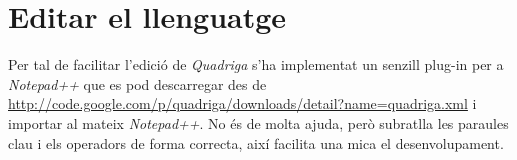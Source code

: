 \section{Editar el llenguatge}

Per tal de facilitar l'edició de {\em Quadriga} s'ha implementat un senzill plug-in per a {\em Notepad++} que es pod descarregar des de \url{http://code.google.com/p/quadriga/downloads/detail?name=quadriga.xml} i importar al mateix {\em Notepad++}. No és de molta ajuda, però subratlla les paraules clau i els operadors de forma correcta, així facilita una mica el desenvolupament.